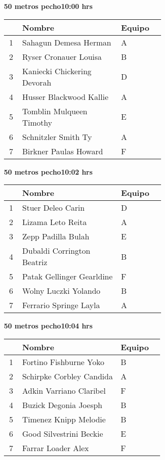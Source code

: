 \begin{minipage}{0.95\linewidth}
\begin{center}
\textbf{
50 metros pecho\hspace{1cm}10:00 hrs}
\end{center}
\begin{tabular}{cp{0.63\linewidth}l}
\hline
& \textbf{Nombre} & \textbf{Equipo} \\ \hline
1 & Sahagun Demesa Herman & A \\ 
2 & Ryser Cronauer Louisa & B \\ 
3 & Kaniecki Chickering Devorah & D \\ 
4 & Husser Blackwood Kallie & A \\ 
5 & Tomblin Mulqueen Timothy & E \\ 
6 & Schnitzler Smith Ty & A \\ 
7 & Birkner Paulas Howard & F \\ 
\end{tabular}
\end{minipage}
\begin{minipage}{0.95\linewidth}
\begin{center}
\textbf{
50 metros pecho\hspace{1cm}10:02 hrs}
\end{center}
\begin{tabular}{cp{0.63\linewidth}l}
\hline
& \textbf{Nombre} & \textbf{Equipo} \\ \hline
1 & Stuer Deleo Carin & D \\ 
2 & Lizama Leto Reita & A \\ 
3 & Zepp Padilla Bulah & E \\ 
4 & Dubaldi Corrington Beatriz & B \\ 
5 & Patak Gellinger Gearldine & F \\ 
6 & Wolny Luczki Yolando & B \\ 
7 & Ferrario Springe Layla & A \\ 
\end{tabular}
\end{minipage}
\begin{minipage}{0.95\linewidth}
\begin{center}
\textbf{
50 metros pecho\hspace{1cm}10:04 hrs}
\end{center}
\begin{tabular}{cp{0.63\linewidth}l}
\hline
& \textbf{Nombre} & \textbf{Equipo} \\ \hline
1 & Fortino Fishburne Yoko & B \\ 
2 & Schirpke Corbley Candida & A \\ 
3 & Adkin Varriano Claribel & F \\ 
4 & Buzick Degonia Joesph & B \\ 
5 & Timenez Knipp Melodie & B \\ 
6 & Good Silvestrini Beckie & E \\ 
7 & Farrar Loader Alex & F \\ 
\end{tabular}
\end{minipage}
